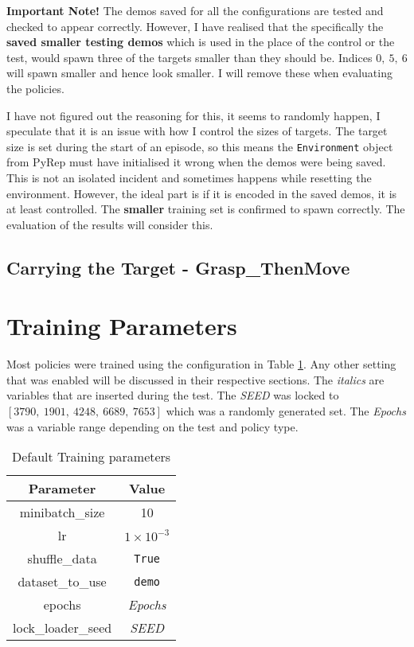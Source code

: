 \textbf{Important Note!}
The demos saved for all the configurations are tested and checked to appear correctly. However, I have realised that the specifically the \textbf{saved smaller testing demos} which is used in the place of the control or the test, would spawn three of the targets smaller than they should be. Indices  \(0, ~5, ~6\)  will spawn smaller and hence look smaller. I will remove these when evaluating the policies.

I have not figured out the reasoning for this, it seems to randomly happen, I speculate that it is an issue with how I control the sizes of targets. The target size is set during the start of an episode, so this means the \verb|Environment| object from PyRep must have initialised it wrong when the demos were being saved. This is not an isolated incident and sometimes happens while resetting the environment. However, the ideal part is if it is encoded in the saved demos, it is at least controlled. The \textbf{smaller} training set is confirmed to spawn correctly. The evaluation of the results will consider this.

\subsection{Carrying the Target - \textbf{Grasp\_ThenMove}}

\section{Training Parameters}
Most policies were trained using the configuration in Table \ref{tab:eval-training-params}. Any other setting that was enabled will be discussed in their respective sections. The \emph{italics} are variables that are inserted during  the test. The \emph{SEED} was locked to \( \left[ 3790, ~1901, ~4248, ~6689, ~7653 \right] \) which was a randomly generated set. The \emph{Epochs} was a variable range depending on the test and policy type.

\begin{table}[ht]
\centering
  \begin{tabular}{|| c | c ||}
  \hline
  Parameter & Value \\
  \hline
  minibatch\_size & 10 \\
  lr & $1\times 10^{-3}$ \\
  shuffle\_data & \texttt{True} \\
  dataset\_to\_use & \texttt{demo} \\
  epochs & \emph{Epochs} \\
  lock\_loader\_seed & \emph{SEED} \\
  \hline
  \end{tabular}\caption{Default Training parameters}\label{tab:eval-training-params}
\end{table}